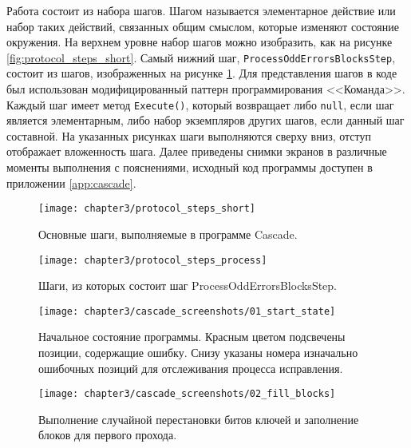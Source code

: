 Работа состоит из набора шагов. Шагом называется элементарное действие или набор таких действий, связанных общим смыслом, которые изменяют состояние окружения. 
На верхнем уровне набор шагов можно изобразить, как на рисунке \ref{fig:protocol_steps_short}. Самый нижний шаг, \texttt{ProcessOddErrorsBlocksStep}, состоит из шагов, изображенных на рисунке \ref{fig:protocol_steps_process}. Для представления шагов в коде был использован модифицированный паттерн программирования <<Команда>>. Каждый шаг имеет метод \texttt{Execute()}, который возвращает либо \texttt{null}, если шаг является элементарным, либо набор экземпляров других шагов, если данный шаг составной. На указанных рисунках шаги выполняются сверху вниз, отступ отображает вложенность шага. Далее приведены снимки экранов в различные моменты выполнения с пояснениями, исходный код программы доступен в приложении \ref{app:cascade}.

\begin{figure}[h]
\begin{center}
  \begin{minipage}[h]{0.4\linewidth}
    \texttt{[image: chapter3/protocol\_steps\_short]}
    \caption{Основные шаги, выполняемые в программе Cascade.}
    \label{fig:protocol_steps_short}
  \end{minipage}
  \hfill 
  \begin{minipage}[h]{0.4\linewidth}
    \texttt{[image: chapter3/protocol\_steps\_process]}
    \caption{Шаги, из которых состоит шаг ProcessOddErrorsBlocksStep.}
    \label{fig:protocol_steps_process}
  \end{minipage}
\end{center}  
\end{figure}

\FloatBarrier
\begin{figure}[h]
  \texttt{[image: chapter3/cascade\_screenshots/01\_start\_state]}
  \caption{Начальное состояние программы. Красным цветом подсвечены позиции, содержащие ошибку. Снизу указаны номера изначально ошибочных позиций для отслеживания процесса исправления.}
\end{figure}

\begin{figure}[h]
  \texttt{[image: chapter3/cascade\_screenshots/02\_fill\_blocks]}
  \caption{Выполнение случайной перестановки битов ключей и заполнение блоков для первого прохода.}
\end{figure}

